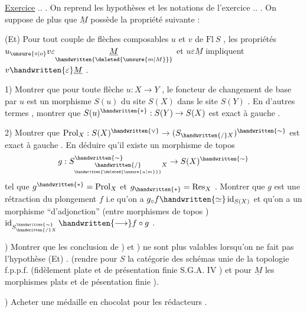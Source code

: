 \uline{Exercice} .. . On reprend les hypothèses et les notations de l'exercice .. . On suppose de plus que \(\underline{M}\) possède la propriété suivante :

(Et) Pour tout couple de flèches composables \(u\) et \(v\) de \(\mathrm{Fl}\ S\) , les  propriétés \(u_{\unsure{\circ|o}}v\varepsilon\underset{\handwritten{\deleted{\unsure{m|M}}}}{\underline{M}}\) et \(u\varepsilon\underline{M}\) impliquent \(v\handwritten{\varepsilon}\underline{M}\) .

1) Montrer que pour toute flèche \(u:X\to Y\) , le foncteur de changement de base par \(u\) est un morphisme  \(S(u)\) du site \(S(X)\) dans le site \(S(Y)\) . En d'autres termes , montrer que \(S(u)^{\handwritten{*}}:S(Y)\to S(X)\) est exact à gauche .

2) Montrer que \(\operatorname{Prol}_X:S(X)^{\handwritten{\vee}}\to(S_{\handwritten{/}X})^{\handwritten{\sim}}\) est exact à gauche . En déduire qu'il existe un morphisme de topos
\[
g:S^{\handwritten{\sim}}_{\underset{\handwritten{\deleted{\unsure{u|m}}}}{\handwritten{/}}X}\to S(X)^{\handwritten{\sim}}
\]
tel que \(g^{\handwritten{*}}=\operatorname{Prol}_X\) et \(g_{\handwritten{*}}=\operatorname{Res}_X\) . Montrer que \(g\) est une rétraction du plongement \(f\) i.e qu'on a \(g_{\circ}f\handwritten{\simeq}\operatorname{id}_{S(X)}\) et qu'on a un morphisme ``d'adjonction'' (entre morphismes de topos ) \(\operatorname{id}_{S^{\handwritten{\sim}}_{\handwritten{/}X}}\handwritten{\longrightarrow} f\circ g\) .

) Montrer que les conclusion de ) et ) ne sont plus valables lorsqu'on ne fait pas l'hypothèse (Et) . (rendre pour \(S\) la catégorie des schémas unie de la topologie f.p.p.f. (fidèlement plate et de présentation finie \handwritten{[} S.G.A.  IV \handwritten{]} ) et pour \(\underline{M}\) les morphismes  plats et de pésentation finie ).

) Acheter une médaille en chocolat pour les rédacteurs .
